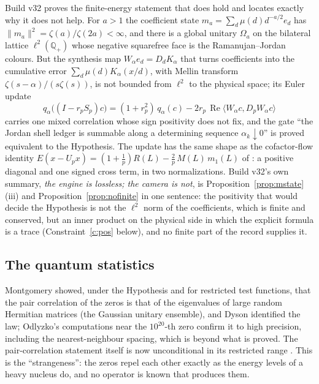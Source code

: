\documentclass[11pt]{article}
\theoremstyle{definition}
\theoremstyle{remark}
\newcommand{\Ree}{\operatorname{Re}}
\begin{document}
Build v32 \cite{v32} proves the finite-energy statement that does hold and locates exactly why it does not help. For $a>1$ the coefficient state $m_a=\sum_d\mu(d)d^{-a/2}e_d$ has $\|m_a\|^2=\zeta(a)/\zeta(2a)<\infty$, and there is a global unitary $\Omega_a$ on the bilateral lattice $\ell^2(\mathbb Q_+)$ whose negative squarefree face is the Ramanujan--Jordan colours. But the synthesis map $W_\alpha e_d=D_dK_\alpha$ that turns coefficients into the cumulative error $\sum_d\mu(d)K_\alpha(x/d)$, with Mellin transform $\zeta(s-\alpha)/(s\zeta(s))$, is not bounded from $\ell^2$ to the physical space; its Euler update
\[
q_\alpha\big((I-r_pS_p)c\big)=(1+r_p^2)\,q_\alpha(c)-2r_p\,\Ree\langle W_\alpha c,D_pW_\alpha c\rangle
\]
carries one mixed correlation whose sign positivity does not fix, and the gate ``the Jordan shell ledger is summable along a determining sequence $\alpha_k\downarrow0$'' is proved equivalent to the Hypothesis. The update has the same shape as the cofactor-flow identity $E(x-U_px)=(1+\tfrac1p)R(L)-\tfrac2p\,M(L)\,m_1(L)$ of \cite[M44]{hrec}: a positive diagonal and one signed cross term, in two normalizations. Build v32's own summary, \emph{the engine is lossless; the camera is not}, is Proposition~\ref{prop:mstate}(iii) and Proposition~\ref{prop:nofinite} in one sentence: the positivity that would decide the Hypothesis is not the $\ell^2$ norm of the coefficients, which is finite and conserved, but an inner product on the physical side in which the explicit formula is a trace (Constraint~\ref{c:pos} below), and no finite part of the record supplies it.

\subsection{The quantum statistics}
Montgomery \cite{montgomery} showed, under the Hypothesis and for restricted test functions, that the pair correlation of the zeros is that of the eigenvalues of large random Hermitian matrices (the Gaussian unitary ensemble), and Dyson identified the law; Odlyzko's computations near the $10^{20}$-th zero \cite{odlyzko} confirm it to high precision, including the nearest-neighbour spacing, which is beyond what is proved. The pair-correlation statement itself is now unconditional in its restricted range \cite{routes}. This is the ``strangeness'': the zeros repel each other exactly as the energy levels of a heavy nucleus do, and no operator is known that produces them.
\end{document}
